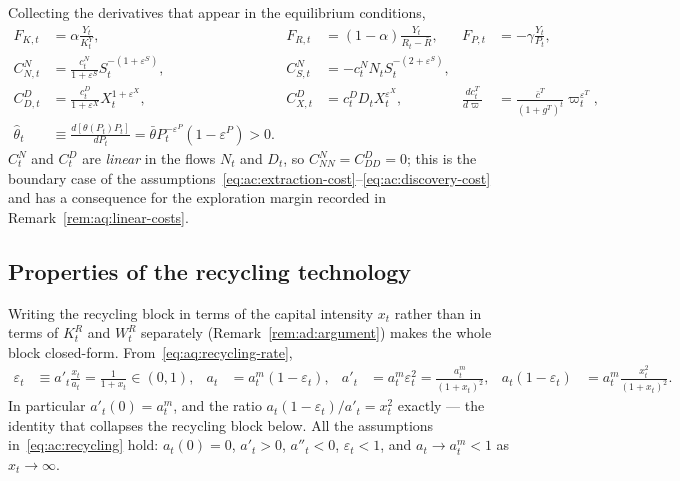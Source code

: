  Collecting the derivatives that appear in the equilibrium conditions,
\begin{align}
F_{K,t} &= \alpha\frac{Y_t}{K^Y_t},
&
F_{R,t} &= (1-\alpha)\frac{Y_t}{R_t-\bar R},
&
F_{P,t} &= -\gamma\frac{Y_t}{P_t},
\label{eq:aq:F-derivatives}
\\
C^N_{N,t} &= \frac{c^N_t}{1+\varepsilon^S}S_t^{-\left(1+\varepsilon^S\right)},
&
C^N_{S,t} &= -c^N_tN_tS_t^{-\left(2+\varepsilon^S\right)},
&
&
\label{eq:aq:CN-derivatives}
\\
C^D_{D,t} &= \frac{c^D_t}{1+\varepsilon^X}X_t^{1+\varepsilon^X},
&
C^D_{X,t} &= c^D_tD_tX_t^{\varepsilon^X},
&
\frac{dc^T_t}{d\varpi} &= \frac{\bar c^T}{\left(1+g^T\right)^t}\varpi_t^{\varepsilon^T},
\label{eq:aq:CD-derivatives}
\\
\widehat\theta_t &\equiv \frac{d\left[\theta(P_t)P_t\right]}{dP_t}=\bar\theta P_t^{-\varepsilon^P}\left(1-\varepsilon^P\right)>0.
\label{eq:aq:theta-hat}
\end{align}
$C^N_t$ and $C^D_t$ are \emph{linear} in the flows $N_t$ and $D_t$, so $C^N_{NN}=C^D_{DD}=0$; this is the boundary case of the assumptions~\eqref{eq:ac:extraction-cost}--\eqref{eq:ac:discovery-cost} and has a consequence for the exploration margin recorded in Remark~\ref{rem:aq:linear-costs}.

\subsection{Properties of the recycling technology}
\label{subsec:aq:recycling-properties}

Writing the recycling block in terms of the capital intensity $x_t$ rather than in terms of $K^R_t$ and $W^R_t$ separately (Remark~\ref{rem:ad:argument}) makes the whole block closed-form. From~\eqref{eq:aq:recycling-rate},
\begin{align}
\varepsilon_t &\equiv a'_t\frac{x_t}{a_t}=\frac{1}{1+x_t}\in(0,1),
&
a_t &= a^m_t\left(1-\varepsilon_t\right),
&
a'_t &= a^m_t\varepsilon_t^2=\frac{a^m_t}{\left(1+x_t\right)^2},
&
a_t\left(1-\varepsilon_t\right) &= a^m_t\frac{x_t^2}{\left(1+x_t\right)^2}.
\label{eq:aq:recycling-algebra}
\end{align}
In particular $a'_t(0)=a^m_t$, and the ratio $a_t(1-\varepsilon_t)/a'_t=x_t^2$ exactly --- the identity that collapses the recycling block below. All the assumptions in~\eqref{eq:ac:recycling} hold: $a_t(0)=0$, $a'_t>0$, $a''_t<0$, $\varepsilon_t<1$, and $a_t\to a^m_t<1$ as $x_t\to\infty$.

